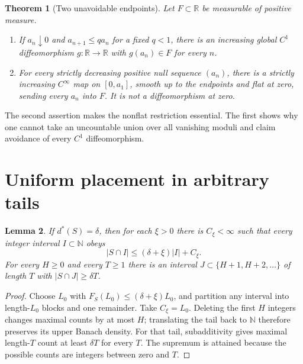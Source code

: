\documentclass[11pt]{article}
\newtheorem{theorem}{Theorem}[section]
\newtheorem{lemma}[theorem]{Lemma}
\theoremstyle{remark}\newtheorem{remark}[theorem]{Remark}
\newcommand{\R}{\mathbb R}\newcommand{\N}{\mathbb N}\newcommand{\Z}{\mathbb Z}
\begin{document}
\begin{theorem}[Two unavoidable endpoints]\label{thm:endpoints}
Let $F\subset\R$ be measurable of positive measure.
\begin{enumerate}
\item If $a_n\downarrow0$ and $a_{n+1}\le q a_n$ for a fixed $q<1$, there is an increasing global $C^1$ diffeomorphism $g:\R\to\R$ with $g(a_n)\in F$ for every $n$.
\item For every strictly decreasing positive null sequence $(a_n)$, there is a strictly increasing $C^\infty$ map on $[0,a_1]$, smooth up to the endpoints and flat at zero, sending every $a_n$ into $F$. It is not a diffeomorphism at zero.
\end{enumerate}
\end{theorem}
The second assertion makes the nonflat restriction essential. The first shows why one cannot take an uncountable union over all vanishing moduli and claim avoidance of every $C^1$ diffeomorphism.

\section{Uniform placement in arbitrary tails}\label{sec:flatten}
\begin{lemma}\label{lem:upper}
If $d^*(S)=\delta$, then for each $\xi>0$ there is $C_\xi<\infty$ such that every integer interval $I\subset\N$ obeys
\[
 |S\cap I|\le(\delta+\xi)|I|+C_\xi.
\]
For every $H\ge0$ and every $T\ge1$ there is an interval $J\subset\{H+1,H+2,\ldots\}$ of length $T$ with $|S\cap J|\ge\delta T$.
\end{lemma}
\begin{proof}
Choose $L_0$ with $F_S(L_0)\le(\delta+\xi)L_0$, and partition any interval into length-$L_0$ blocks and one remainder. Take $C_\xi=L_0$. Deleting the first $H$ integers changes maximal counts by at most $H$; translating the tail back to $\N$ therefore preserves its upper Banach density. For that tail, subadditivity gives maximal length-$T$ count at least $\delta T$ for every $T$. The supremum is attained because the possible counts are integers between zero and $T$.
\end{proof}
\end{document}
